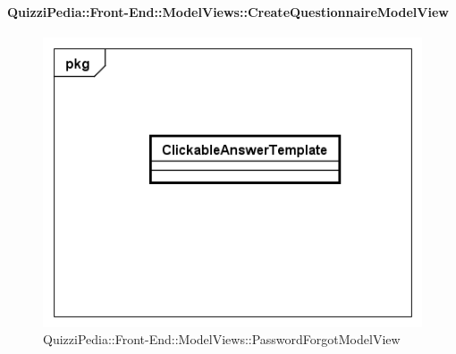 	\paragraph{QuizziPedia::Front-End::ModelViews::CreateQuestionnaireModelView}
	
	\label{QuizziPedia::Front-End::ModelViews::CreateQuestionnaireModelView}
	
	\begin{figure}[ht]
		\centering
		\includegraphics[scale=0.5,keepaspectratio]{UML/Classi/Front-End/QuizziPedia_Front-end_Templates_ClickableAnswerTemplate.png}
		\caption{QuizziPedia::Front-End::ModelViews::PasswordForgotModelView}
	\end{figure} \FloatBarrier
	
